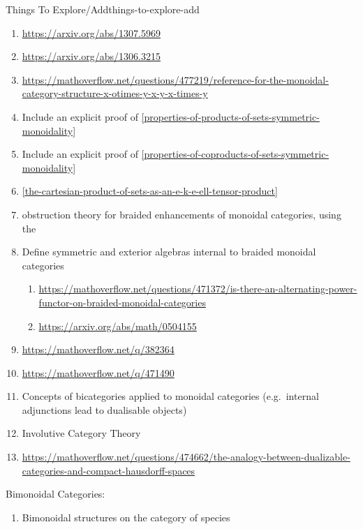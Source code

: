 \begin{remark}{Things To Explore/Add}{things-to-explore-add}
\begin{enumerate}
\begin{enumerate}
                \item Figure out whether this promonad extends to the 1-truncation of the sphere spectrum, and perhaps to other categorified analogues of monoids/groups/rings.
            \end{enumerate}
        \item \url{https://arxiv.org/abs/1307.5969}
        \item \url{https://arxiv.org/abs/1306.3215}
        \item \url{https://mathoverflow.net/questions/477219/reference-for-the-monoidal-category-structure-x-otimes-y-x-y-x-times-y}
        \item Include an explicit proof of \cref{properties-of-products-of-sets-symmetric-monoidality}
        \item Include an explicit proof of \cref{properties-of-coproducts-of-sets-symmetric-monoidality}
        \item \cref{the-cartesian-product-of-sets-as-an-e-k-e-ell-tensor-product}
        \item obstruction theory for braided enhancements of monoidal categories, using the 
        \item Define symmetric and exterior algebras internal to braided monoidal categories
            \begin{enumerate}
                \item \url{https://mathoverflow.net/questions/471372/is-there-an-alternating-power-functor-on-braided-monoidal-categories}
                \item \url{https://arxiv.org/abs/math/0504155}
            \end{enumerate}
        \item \url{https://mathoverflow.net/q/382364}
        \item \url{https://mathoverflow.net/q/471490}
        \item Concepts of bicategories applied to monoidal categories (e.g.\ internal adjunctions lead to dualisable objects)
        \item Involutive Category Theory
        \item \url{https://mathoverflow.net/questions/474662/the-analogy-between-dualizable-categories-and-compact-hausdorff-spaces}
    \end{enumerate}
    Bimonoidal Categories:
    \begin{enumerate}
        \item Bimonoidal structures on the category of species

\end{enumerate}
\end{remark}
